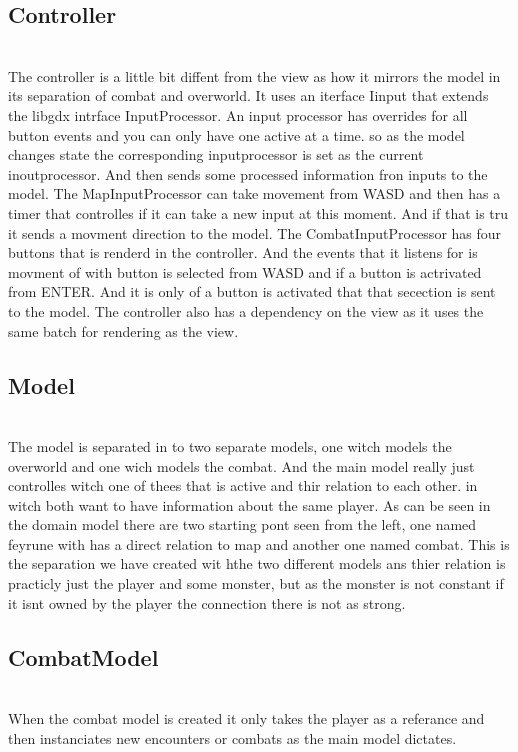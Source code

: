 \subsection{Controller}
\label{controller}

\\The controller is a little bit diffent from the view as how it mirrors the model in its separation of combat and overworld. It uses an iterface Iinput that extends the libgdx intrface InputProcessor. An input processor has overrides for all button events and you can only have one active at a time. so as the model changes state the corresponding inputprocessor is set as the current inoutprocessor. And then sends some processed information fron inputs to the model.
The MapInputProcessor can take movement from WASD and then has a timer that controlles if it can take a new input at this moment. And if that is tru it sends a movment direction to the model. The CombatInputProcessor has four buttons that is renderd in the controller. And the events that it listens for is movment of with button is selected from WASD and if a button is actrivated from ENTER. And it is only of a button is activated that that secection is sent to the model.
The controller also has a dependency on the view as it uses the same batch for rendering as the view.
\subsection{Model}
\label{model}

\\The model is separated in to two separate models, one witch models the overworld and one wich models the combat. And the main model really just controlles witch one of thees that is active and thir relation to each other. in witch both want to have information about the same player. As can be seen in the domain model there are two starting pont seen from the left, one named feyrune with has a direct relation to map and another one named combat. This is the separation we have created wit hthe two different models ans thier relation is practicly just the player and some monster, but as the monster is not constant if it isnt owned by the player the connection there is not as strong.
\subsection{CombatModel}
\label{combatmodel}

\\When the combat model is created it only takes the player as a referance and then instanciates new encounters or combats as the main model dictates.

